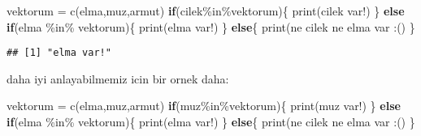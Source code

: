 \documentclass[
]{book}
\newenvironment{Shaded}{\begin{snugshade}}{\end{snugshade}}
\newcommand{\ControlFlowTok}[1]{\textcolor[rgb]{0.13,0.29,0.53}{\textbf{#1}}}
\newcommand{\FunctionTok}[1]{\textcolor[rgb]{0.00,0.00,0.00}{#1}}
\newcommand{\NormalTok}[1]{#1}
\newcommand{\OtherTok}[1]{\textcolor[rgb]{0.56,0.35,0.01}{#1}}
\newcommand{\SpecialCharTok}[1]{\textcolor[rgb]{0.00,0.00,0.00}{#1}}
\newcommand{\StringTok}[1]{\textcolor[rgb]{0.31,0.60,0.02}{#1}}
\begin{document}
\begin{Shaded}
\begin{Highlighting}[]
\NormalTok{vektorum }\OtherTok{=} \FunctionTok{c}\NormalTok{(}\StringTok{\textquotesingle{}elma\textquotesingle{}}\NormalTok{,}\StringTok{\textquotesingle{}muz\textquotesingle{}}\NormalTok{,}\StringTok{\textquotesingle{}armut\textquotesingle{}}\NormalTok{)}
\ControlFlowTok{if}\NormalTok{(}\StringTok{\textquotesingle{}cilek\textquotesingle{}}\SpecialCharTok{\%in\%}\NormalTok{vektorum)\{}
  \FunctionTok{print}\NormalTok{(}\StringTok{\textquotesingle{}cilek var!\textquotesingle{}}\NormalTok{)}
\NormalTok{\} }\ControlFlowTok{else} \ControlFlowTok{if}\NormalTok{(}\StringTok{\textquotesingle{}elma\textquotesingle{}} \SpecialCharTok{\%in\%}\NormalTok{ vektorum)\{}
  \FunctionTok{print}\NormalTok{(}\StringTok{\textquotesingle{}elma var!\textquotesingle{}}\NormalTok{)}
\NormalTok{\} }\ControlFlowTok{else}\NormalTok{\{}
  \FunctionTok{print}\NormalTok{(}\StringTok{\textquotesingle{}ne cilek ne elma var :(\textquotesingle{}}\NormalTok{)}
\NormalTok{\}}
\end{Highlighting}
\end{Shaded}

\begin{verbatim}
## [1] "elma var!"
\end{verbatim}

daha iyi anlayabilmemiz icin bir ornek daha:

\begin{Shaded}
\begin{Highlighting}[]
\NormalTok{vektorum }\OtherTok{=} \FunctionTok{c}\NormalTok{(}\StringTok{\textquotesingle{}elma\textquotesingle{}}\NormalTok{,}\StringTok{\textquotesingle{}muz\textquotesingle{}}\NormalTok{,}\StringTok{\textquotesingle{}armut\textquotesingle{}}\NormalTok{)}
\ControlFlowTok{if}\NormalTok{(}\StringTok{\textquotesingle{}muz\textquotesingle{}}\SpecialCharTok{\%in\%}\NormalTok{vektorum)\{}
  \FunctionTok{print}\NormalTok{(}\StringTok{\textquotesingle{}muz var!\textquotesingle{}}\NormalTok{)}
\NormalTok{\} }\ControlFlowTok{else} \ControlFlowTok{if}\NormalTok{(}\StringTok{\textquotesingle{}elma\textquotesingle{}} \SpecialCharTok{\%in\%}\NormalTok{ vektorum)\{}
  \FunctionTok{print}\NormalTok{(}\StringTok{\textquotesingle{}elma var!\textquotesingle{}}\NormalTok{)}
\NormalTok{\} }\ControlFlowTok{else}\NormalTok{\{}
  \FunctionTok{print}\NormalTok{(}\StringTok{\textquotesingle{}ne cilek ne elma var :(\textquotesingle{}}\NormalTok{)}
\NormalTok{\}}
\end{Highlighting}
\end{Shaded}
\end{document}
